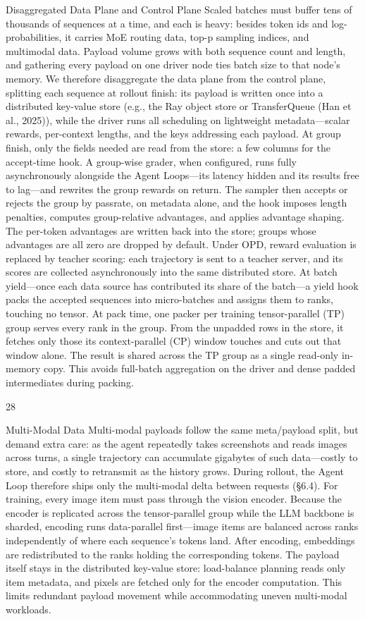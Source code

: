\documentclass[
  10
]{article}
\begin{document}
Disaggregated Data Plane and Control Plane Scaled batches must buffer
tens of thousands of sequences at a time, and each is heavy: besides
token ids and log-probabilities, it carries MoE routing data, top-p
sampling indices, and multimodal data. Payload volume grows with both
sequence count and length, and gathering every payload on one driver
node ties batch size to that node's memory. We therefore disaggregate
the data plane from the control plane, splitting each sequence at
rollout finish: its payload is written once into a distributed key-value
store (e.g., the Ray object store or TransferQueue (Han et al., 2025)),
while the driver runs all scheduling on lightweight metadata---scalar
rewards, per-context lengths, and the keys addressing each payload. At
group finish, only the fields needed are read from the store: a few
columns for the accept-time hook. A group-wise grader, when configured,
runs fully asynchronously alongside the Agent Loops---its latency hidden
and its results free to lag---and rewrites the group rewards on return.
The sampler then accepts or rejects the group by passrate, on metadata
alone, and the hook imposes length penalties, computes group-relative
advantages, and applies advantage shaping. The per-token advantages are
written back into the store; groups whose advantages are all zero are
dropped by default. Under OPD, reward evaluation is replaced by teacher
scoring: each trajectory is sent to a teacher server, and its scores are
collected asynchronously into the same distributed store. At batch
yield---once each data source has contributed its share of the batch---a
yield hook packs the accepted sequences into micro-batches and assigns
them to ranks, touching no tensor. At pack time, one packer per training
tensor-parallel (TP) group serves every rank in the group. From the
unpadded rows in the store, it fetches only those its context-parallel
(CP) window touches and cuts out that window alone. The result is shared
across the TP group as a single read-only in-memory copy. This avoids
full-batch aggregation on the driver and dense padded intermediates
during packing.

28

Multi-Modal Data Multi-modal payloads follow the same meta/payload
split, but demand extra care: as the agent repeatedly takes screenshots
and reads images across turns, a single trajectory can accumulate
gigabytes of such data---costly to store, and costly to retransmit as
the history grows. During rollout, the Agent Loop therefore ships only
the multi-modal delta between requests (§6.4). For training, every image
item must pass through the vision encoder. Because the encoder is
replicated across the tensor-parallel group while the LLM backbone is
sharded, encoding runs data-parallel first---image items are balanced
across ranks independently of where each sequence's tokens land. After
encoding, embeddings are redistributed to the ranks holding the
corresponding tokens. The payload itself stays in the distributed
key-value store: load-balance planning reads only item metadata, and
pixels are fetched only for the encoder computation. This limits
redundant payload movement while accommodating uneven multi-modal
workloads.
\end{document}
